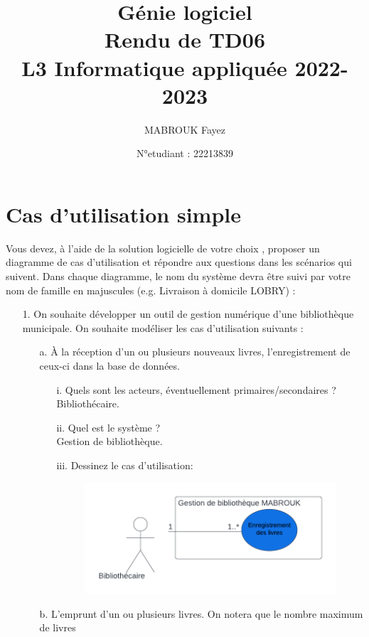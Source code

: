 \documentclass[12pt]{article}
\author{MABROUK Fayez}
\date{N°etudiant : 22213839}
\title{{\bf  Génie logiciel} \\
	Rendu de TD06\\
	{\small L3 Informatique appliquée 2022-2023} \\
	{\it \small }}
\begin{document}
	\maketitle
	\newpage
	\section{Cas d'utilisation simple}
	Vous devez, à l’aide de la solution logicielle de votre choix , proposer un diagramme de cas d’utilisation et répondre aux questions dans les
	scénarios qui suivent. Dans chaque diagramme, le nom du système devra être suivi par votre nom de
	famille en majuscules (e.g. Livraison à domicile LOBRY) :
	\begin{itemize}
		\item[1. ] On souhaite développer un outil de gestion numérique d’une bibliothèque municipale. On
		souhaite modéliser les cas d’utilisation suivants :
		\begin{itemize}
			\item[a. ] À la réception d’un ou plusieurs nouveaux livres, l’enregistrement de ceux-ci dans la
			base de données.
			\begin{itemize}
				\item[i. ] Quels sont les acteurs, éventuellement primaires/secondaires ?\\
				Bibliothécaire.
				\item[ii. ] Quel est le système ?\\
				Gestion de bibliothèque.
				\item[iii. ] Dessinez le cas d’utilisation: 
				\begin{figure}[!hbtp]
					\includegraphics[scale=0.75]{capture1_S.PNG}
				\end{figure}
			\end{itemize}
		\item[b. ] L’emprunt d’un ou plusieurs livres. On notera que le nombre maximum de livres

\end{itemize}
\end{itemize}
\end{document}
